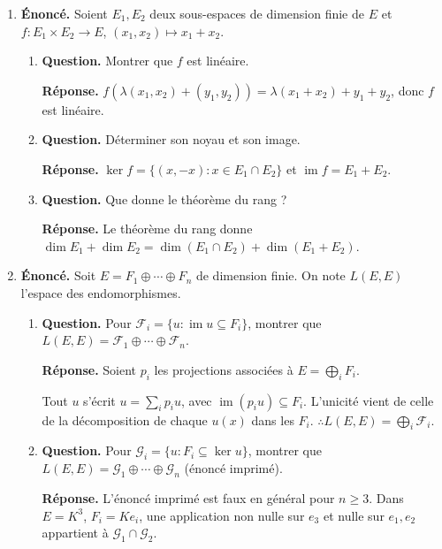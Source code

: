 \documentclass[12pt, a4paper]{article}
\begin{document}
\begin{enumerate}[label=7.\arabic*., start=68]
  \item \begin{minipage}[t]{\linewidth}\raggedright
\textbf{Énoncé.} Soient $E_1,E_2$ deux sous-espaces de dimension finie de $E$ et $f:E_1\times E_2\to E$, $(x_1,x_2)\mapsto x_1+x_2$.

\begin{enumerate}[\arabic*.]
        \item \textbf{Question.} Montrer que $f$ est linéaire.
\par\smallskip
\textbf{Réponse.} $f(\lambda(x_1,x_2)+(y_1,y_2))=\lambda(x_1+x_2)+y_1+y_2$, donc $f$ est linéaire.

  \item \textbf{Question.} Déterminer son noyau et son image.
\par\smallskip
\textbf{Réponse.} $\ker f=\{(x,-x):x\in E_1\cap E_2\}$ et $\operatorname{im}f=E_1+E_2$.

  \item \textbf{Question.} Que donne le théorème du rang ?
\par\smallskip
\textbf{Réponse.} Le théorème du rang donne $\dim E_1+\dim E_2=\dim(E_1\cap E_2)+\dim(E_1+E_2)$.

\end{enumerate}
\end{minipage}

  \item \begin{minipage}[t]{\linewidth}\raggedright
\textbf{Énoncé.} Soit $E=F_1\oplus\cdots\oplus F_n$ de dimension finie. On note $L(E,E)$ l’espace des endomorphismes.

\begin{enumerate}[\arabic*.]
        \item \textbf{Question.} Pour $\mathcal F_i=\{u:\operatorname{im}u\subseteq F_i\}$, montrer que $L(E,E)=\mathcal F_1\oplus\cdots\oplus\mathcal F_n$.
\par\smallskip
\textbf{Réponse.} Soient $p_i$ les projections associées à $E=\bigoplus_iF_i$.

Tout $u$ s'écrit $u=\sum_i p_i u$, avec $\operatorname{im}(p_i u)\subseteq F_i$.
        L'unicité vient de celle de la décomposition de chaque $u(x)$ dans les $F_i$.
        $\therefore L(E,E)=\bigoplus_i\mathcal F_i$.

  \item \textbf{Question.} Pour $\mathcal G_i=\{u:F_i\subseteq\ker u\}$, montrer que $L(E,E)=\mathcal G_1\oplus\cdots\oplus\mathcal G_n$ (énoncé imprimé).
\par\smallskip
\textbf{Réponse.} L'énoncé imprimé est faux en général pour $n\geq3$.
        Dans $E=K^3$, $F_i=Ke_i$, une application non nulle sur $e_3$ et nulle sur $e_1,e_2$ appartient à $\mathcal G_1\cap\mathcal G_2$.


\end{enumerate}
\end{minipage}
\end{enumerate}
\end{document}
